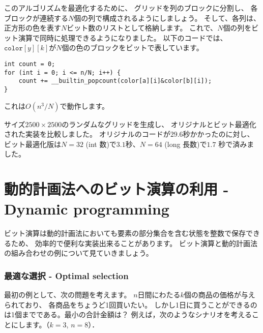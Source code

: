 このアルゴリズムを最適化するために、
グリッドを列のブロックに分割し、
各ブロックが連続する$N$個の列で構成されるようにしましょう。
そして、各列は、正方形の色を表す$N$ビット数のリストとして格納します。
これで、$N$個の列をビット演算で同時に処理できるようになりました。
以下のコードでは、$\texttt{color}[y][k]$が$N$個の色のブロックをビットで表しています。

\begin{lstlisting}
int count = 0;
for (int i = 0; i <= n/N; i++) {
    count += __builtin_popcount(color[a][i]&color[b][i]);
}
\end{lstlisting}
これは$O(n^3/N)$で動作します。

サイズ$2500 \times 2500$のランダムなグリッドを生成し、
オリジナルとビット最適化された実装を比較しました。
オリジナルのコードが$29.6$秒かかったのに対し、
ビット最適化版は$N = 32$ (int 数)で$3.1$秒、$N = 64$ (long 長数)で$1.7$ 秒で済みました。

\section{動的計画法へのビット演算の利用 - Dynamic programming}

ビット演算は動的計画法においても要素の部分集合を含む状態を整数で保存できるため、
効率的で便利な実装出来ることがあります。
ビット演算と動的計画法の組み合わせの例について見ていきましょう。

\subsubsection{最適な選択 - Optimal selection}

最初の例として、次の問題を考えます。
$n$日間にわたる$k$個の商品の価格が与えられており、
各商品をちょうど1回買いたい。
しかし1日に買うことができるのは1個までである。最小の合計金額は？
例えば，次のようなシナリオを考えることにします。（$k = 3$, $n = 8$）．

